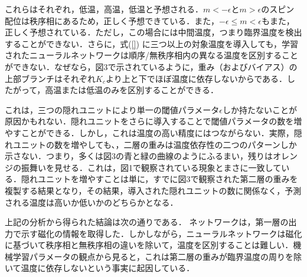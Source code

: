 \documentclass[a4paper,11pt]{jsarticle}
\begin{document}
これらはそれぞれ，低温，高温，低温と予想される．$m<-\epsilon$と$m>\epsilon$のスピン配位は秩序相にあるため，正しく予想できている．また，$-\epsilon \leq m < \epsilon$もまた，正しく予想されている．ただし，この場合には中間温度，つまり臨界温度を検出することができない．さらに，式(\ref{}) に三つ以上の対象温度を導入しても，学習されたニューラルネットワークは順序/無秩序相内の異なる温度を区別することができない．なぜなら，図3で示されているように，重み（およびバイアス）の上部ブランチはそれぞれ$K_c$より上と下でほぼ温度に依存しないからである．したがって，高温または低温のみを区別することができる．\par
これは，三つの隠れユニットにより単一の閾値パラメータ$\epsilon$しか持たないことが原因かもれない．隠れユニットをさらに導入することで閾値パラメータの数を増やすことができる．しかし，これは温度の高い精度にはつながらない．実際，隠れユニットの数を増やしても、，二層の重みは温度依存性の二つのパターンしか示さない．つまり，多くは図3の青と緑の曲線のようにふるまい，残りはオレンジの振舞いを見せる．これは，図1で観察されている現象とまさに一致している．隠れユニットを増やすことは単に，すでに図3で観察された第二層の重みを複製する結果となり，その結果，導入された隠れユニットの数に関係なく，予測される温度は高いか低いかのどちらかとなる．\par
上記の分析から得られた結論は次の通りである．
ネットワークは，第一層の出力で示す磁化の情報を取得した．しかしながら，ニューラルネットワークは磁化に基づいて秩序相と無秩序相の違いを除いて，温度を区別することは難しい．機械学習パラメータの観点から見ると，これは第二層の重みが臨界温度の周りを除いて温度に依存しないという事実に起因している．
\end{document}
